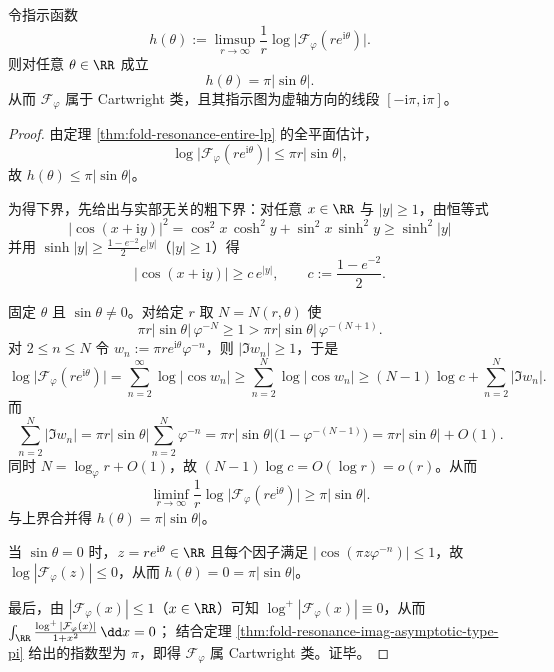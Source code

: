 \begin{theorem}\label{thm:fold-resonance-cartwright-indicator}
令指示函数
\[
h(\theta):=\limsup_{r\to\infty}\frac{1}{r}\log\bigl|\mathcal{F}_\varphi(re^{\mathrm{i}\theta})\bigr|.
\]
则对任意 \(\theta\in\RR\) 成立
\[
h(\theta)=\pi|\sin\theta|.
\]
从而 \(\mathcal{F}_\varphi\) 属于 Cartwright 类，且其指示图为虚轴方向的线段 \([-\mathrm{i}\pi,\mathrm{i}\pi]\)。
\end{theorem}

\begin{proof}
由定理 \ref{thm:fold-resonance-entire-lp} 的全平面估计，
\[
\log\bigl|\mathcal{F}_\varphi(re^{\mathrm{i}\theta})\bigr|\le \pi r|\sin\theta|,
\]
故 \(h(\theta)\le \pi|\sin\theta|\)。

为得下界，先给出与实部无关的粗下界：对任意 \(x\in\RR\) 与 \(|y|\ge 1\)，由恒等式
\[
|\cos(x+\mathrm{i}y)|^2=\cos^2x\,\cosh^2y+\sin^2x\,\sinh^2y\ge \sinh^2|y|
\]
并用 \(\sinh|y|\ge \frac{1-e^{-2}}{2}e^{|y|}\)（\(|y|\ge 1\)）得
\[
|\cos(x+\mathrm{i}y)|\ge c\,e^{|y|},\qquad c:=\frac{1-e^{-2}}{2}.
\]

固定 \(\theta\) 且 \(\sin\theta\neq 0\)。对给定 \(r\) 取 \(N=N(r,\theta)\) 使
\[
\pi r|\sin\theta|\,\varphi^{-N}\ge 1>\pi r|\sin\theta|\,\varphi^{-(N+1)}.
\]
对 \(2\le n\le N\) 令 \(w_n:=\pi r e^{\mathrm{i}\theta}\varphi^{-n}\)，则 \(|\Im w_n|\ge 1\)，于是
\[
\log\bigl|\mathcal{F}_\varphi(re^{\mathrm{i}\theta})\bigr|
=\sum_{n=2}^{\infty}\log|\cos w_n|
\ge \sum_{n=2}^{N}\log|\cos w_n|
\ge (N-1)\log c+\sum_{n=2}^{N}|\Im w_n|.
\]
而
\[
\sum_{n=2}^{N}|\Im w_n|
=\pi r|\sin\theta|\sum_{n=2}^{N}\varphi^{-n}
=\pi r|\sin\theta|\bigl(1-\varphi^{-(N-1)}\bigr)
=\pi r|\sin\theta|+O(1).
\]
同时 \(N=\log_\varphi r+O(1)\)，故 \((N-1)\log c=O(\log r)=o(r)\)。从而
\[
\liminf_{r\to\infty}\frac{1}{r}\log\bigl|\mathcal{F}_\varphi(re^{\mathrm{i}\theta})\bigr|
\ge \pi|\sin\theta|.
\]
与上界合并得 \(h(\theta)=\pi|\sin\theta|\)。

当 \(\sin\theta=0\) 时，\(z=re^{\mathrm{i}\theta}\in\RR\) 且每个因子满足 \(|\cos(\pi z\varphi^{-n})|\le 1\)，故
\(\log|\mathcal{F}_\varphi(z)|\le 0\)，从而 \(h(\theta)=0=\pi|\sin\theta|\)。

最后，由 \(|\mathcal{F}_\varphi(x)|\le 1\)（\(x\in\RR\)）可知 \(\log^+|\mathcal{F}_\varphi(x)|\equiv 0\)，从而
\(\int_{\RR}\frac{\log^+|\mathcal{F}_\varphi(x)|}{1+x^2}\,\dd x=0\)；
结合定理 \ref{thm:fold-resonance-imag-asymptotic-type-pi} 给出的指数型为 \(\pi\)，即得 \(\mathcal{F}_\varphi\) 属 Cartwright 类。证毕。
\end{proof}

